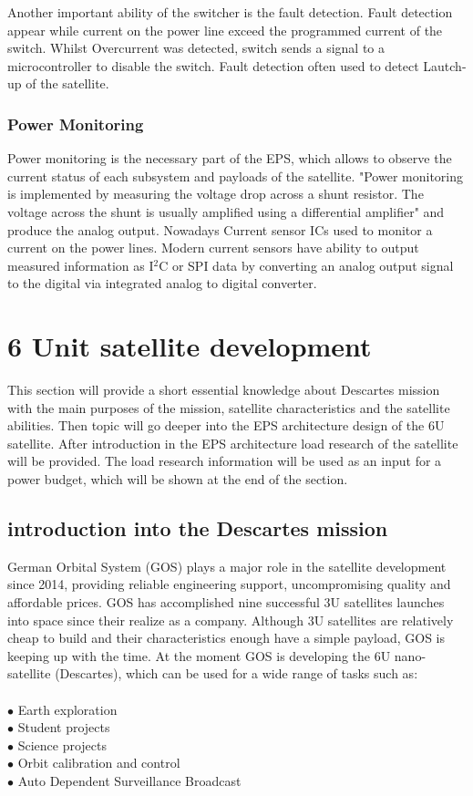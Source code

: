 Another important ability of the switcher is the fault detection. Fault detection appear while current on the power line exceed the programmed current of the switch. Whilst Overcurrent was detected, switch sends a signal to a microcontroller to disable the switch. Fault detection often used to detect Lautch-up of the satellite.\\

\subsubsection{Power Monitoring}

Power monitoring is the necessary part of the EPS, which allows to observe the current status of each subsystem and payloads of the satellite. \cite{22} "Power monitoring is implemented by measuring the 
voltage drop across a shunt resistor.  The voltage across the shunt  is  usually  amplified  using  a  differential amplifier" and produce the analog output. Nowadays Current sensor ICs used to monitor a current on the power lines. Modern current sensors have ability to output measured information as I$^{2}$C or SPI data by converting an analog output signal to the digital via integrated analog to digital converter. 

\newpage   
\section {6 Unit satellite development}
This section will provide a short essential knowledge about Descartes mission with the main purposes of the mission, satellite characteristics and the satellite  abilities. Then topic will go deeper into the EPS architecture design of the 6U satellite. After introduction in the EPS architecture load research of the satellite will be provided. The load research information will be used as an input for a power budget, which will be shown at the end of the section. \\
\subsection{introduction into the Descartes mission}

German Orbital System (GOS) plays a major role in the satellite development since 2014, providing reliable engineering support, uncompromising quality and affordable prices. GOS has accomplished nine successful 3U satellites launches into space since their realize as a company. Although 3U satellites are relatively cheap to build and their characteristics enough have a simple payload, GOS is keeping up with the time. At the moment GOS is developing the 6U nano-satellite (Descartes), which can be used for a wide range of tasks such as:\\ \\
$\bullet$ Earth exploration\\ 
$\bullet$ Student projects\\ 
$\bullet$ Science projects\\ 
$\bullet$ Orbit calibration and control\\ 
$\bullet$ Auto Dependent Surveillance Broadcast\\ 



